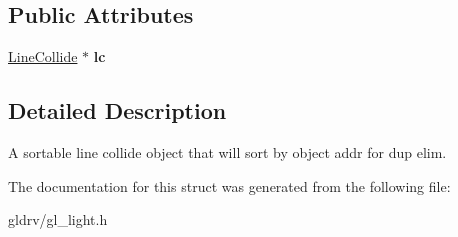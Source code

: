 \subsection*{Public Attributes}
\begin{DoxyCompactItemize}
\item 
\hyperlink{structLineCollide}{Line\+Collide} $\ast$ {\bfseries lc}\hypertarget{structLineCollideStar_a9143a9bb634ba8e7adbb4b57e3977747}{}\label{structLineCollideStar_a9143a9bb634ba8e7adbb4b57e3977747}

\end{DoxyCompactItemize}


\subsection{Detailed Description}
A sortable line collide object that will sort by object addr for dup elim. 

The documentation for this struct was generated from the following file\+:\begin{DoxyCompactItemize}
\item 
gldrv/gl\+\_\+light.\+h\end{DoxyCompactItemize}
